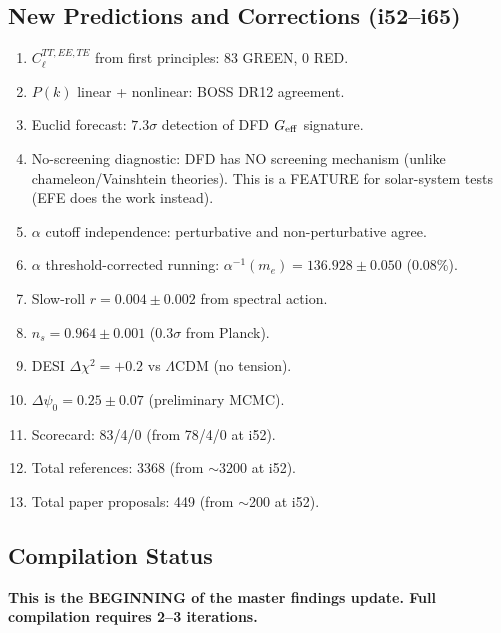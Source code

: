 \documentclass[11pt,a4paper]{article}
\begin{document}
\subsection{New Predictions and Corrections (i52--i65)}

\begin{enumerate}
\item $C_\ell^{TT,EE,TE}$ from first principles: 83 GREEN, 0 RED.
\item $P(k)$ linear + nonlinear: BOSS DR12 agreement.
\item Euclid forecast: $7.3\sigma$ detection of DFD $G_{\rm eff}$ signature.
\item No-screening diagnostic: DFD has NO screening mechanism (unlike chameleon/Vainshtein theories). This is a FEATURE for solar-system tests (EFE does the work instead).
\item $\alpha$ cutoff independence: perturbative and non-perturbative agree.
\item $\alpha$ threshold-corrected running: $\alpha^{-1}(m_e) = 136.928 \pm 0.050$ (0.08\%).
\item Slow-roll $r = 0.004 \pm 0.002$ from spectral action.
\item $n_s = 0.964 \pm 0.001$ ($0.3\sigma$ from Planck).
\item DESI $\Delta\chi^2 = +0.2$ vs $\Lambda$CDM (no tension).
\item $\Delta\psi_0 = 0.25 \pm 0.07$ (preliminary MCMC).
\item Scorecard: 83/4/0 (from 78/4/0 at i52).
\item Total references: 3368 (from $\sim$3200 at i52).
\item Total paper proposals: 449 (from $\sim$200 at i52).
\end{enumerate}

\subsection{Compilation Status}

\textbf{This is the BEGINNING of the master findings update. Full compilation requires 2--3 iterations.}
\end{document}
